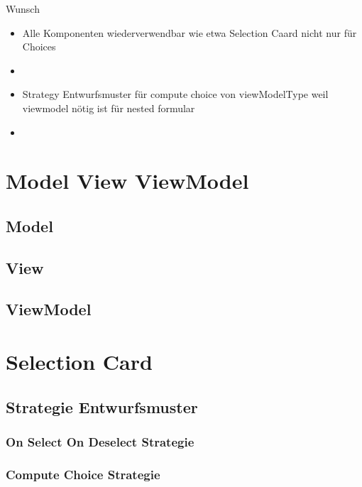 \documentclass[12pt, twoside]{article}
\begin{document}
 
  

   


 







Wunsch
\begin{itemize}
	\item Alle Komponenten wiederverwendbar wie etwa Selection Caard nicht nur für Choices
	\item 
\end{itemize}

\begin{itemize}
	\item Strategy Entwurfsmuster für compute choice von viewModelType weil viewmodel nötig ist für nested formular
	\item 
\end{itemize}

\section{Model View ViewModel}

\subsection{Model}
\subsection{View}
\subsection{ViewModel}


\section{Selection Card}

\subsection{Strategie Entwurfsmuster}
\subsubsection{On Select On Deselect Strategie}
\subsubsection{Compute Choice Strategie}
\end{document}
